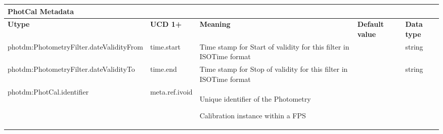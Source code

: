 \documentclass[11pt,a4paper]{ivoa}
\begin{document}
\begin{appendices}



\newpage



\begin{table}[H]
\centering
\begin{adjustbox}{angle=90}
\begin{tabular}{p{2.5in}|p{1.5in}|p{2in}|p{0.74in}|p{0.35in}}
\multicolumn{5}{p{\dimexpr6.59in+8\tabcolsep\relax}}{\centering 
{\fontsize{10pt}{12.0pt}\selectfont \textbf{PhotCal Metadata}}} \\
\hline
\multicolumn{1}{p{2.5in}}{{\fontsize{8pt}{8pt}\selectfont \textbf{Utype}}} &
\multicolumn{1}{p{1.5in}}{{\fontsize{8pt}{8pt}\selectfont \textbf{UCD 1+}}} &
\multicolumn{1}{p{2in}}{{\fontsize{8pt}{8pt}\selectfont \textbf{Meaning}}} &
\multicolumn{1}{p{0.74in}}{{\fontsize{8pt}{8pt}\selectfont \textbf{Default value}}} &
\multicolumn{1}{p{0.35in}}{{\fontsize{8pt}{8pt}\selectfont \textbf{Data type}}} \\
\hline
\multicolumn{1}{p{2.5in}}{{\fontsize{8pt}{8pt}\selectfont photdm:PhotometryFilter.dateValidityFrom}} &
\multicolumn{1}{p{1.5in}}{{\fontsize{8pt}{8pt}\selectfont time.start}} &
\multicolumn{1}{p{2in}}{{\fontsize{8pt}{8pt}\selectfont Time stamp for Start of validity for 
this filter in ISOTime format }} &
\multicolumn{1}{p{0.74in}}{} &
\multicolumn{1}{p{0.35in}}{{\fontsize{8pt}{8pt}\selectfont string }} \\
\hline
\multicolumn{1}{p{2.5in}}{{\fontsize{8pt}{8pt}
\selectfont photdm:PhotometryFilter.dateValidityTo}} &
\multicolumn{1}{p{1.5in}}{{\fontsize{8pt}{8pt}\selectfont time.end}} &
\multicolumn{1}{p{2in}}{{\fontsize{8pt}{8pt}\selectfont Time stamp for Stop of validity 
for this filter in ISOTime format }} &
\multicolumn{1}{p{0.74in}}{} &
\multicolumn{1}{p{0.35in}}{{\fontsize{8pt}{8pt}\selectfont string }} \\
\hline
\multicolumn{1}{p{2.5in}}{{\fontsize{8pt}{8pt}\selectfont photdm:PhotCal.identifier}} &
\multicolumn{1}{p{1.5in}}{{\fontsize{8pt}{8pt}\selectfont meta.ref.ivoid }} &
\multicolumn{1}{p{2in}}{{\fontsize{8pt}{8pt}\selectfont Unique identifier of the Photometry } 
\par {\fontsize{8pt}{8pt}\selectfont Calibration instance within a FPS}} &
\multicolumn{1}{p{0.74in}}{} &

\end{tabular}
\end{adjustbox}
\end{table}
\end{appendices}
\end{document}

